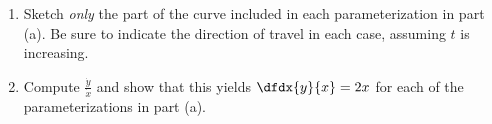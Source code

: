 \begin{embeddedproblem-enumerate}
\begin{enumerate}[label={\bf{}(\alph*)}]
\begin{enumerate}[label={\bf{}(\roman*)}]
\begin{multicols}{3}
      \end{multicols}
    \end{enumerate}
  \item Sketch \emph{only} the part of the curve included in each
    parameterization in part (a).  Be sure to indicate the direction
    of travel in each case, assuming $t$ is increasing.
  \item Compute $\frac{\dot{y}}{\dot{x}}$ and show that this yields
    $\dfdx{y}{x}=2x$ for each of the parameterizations in part (a).
  \end{enumerate}
\end{embeddedproblem-enumerate}

